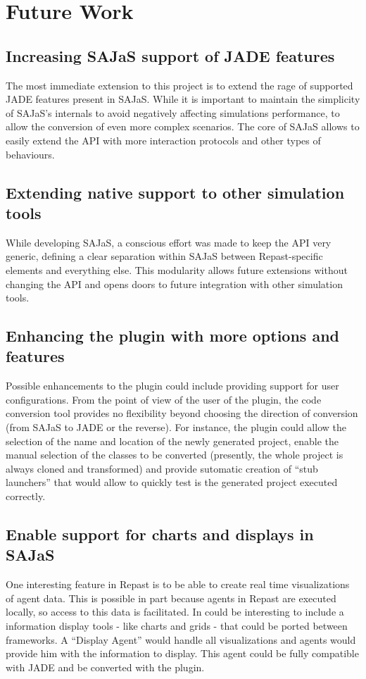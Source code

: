 \chapter{Future Work}
\label{chap:futurework}

\section{Increasing SAJaS support of JADE features}
The most immediate extension to this project is to extend the rage of supported JADE features present in SAJaS. While it is important to maintain the simplicity of SAJaS's internals to avoid negatively affecting simulations performance, to allow the conversion of even more complex scenarios. The core of SAJaS allows to easily extend the API with more interaction protocols and other types of behaviours.

\section{Extending native support to other simulation tools}
While developing SAJaS, a conscious effort was made to keep the API very generic, defining a clear separation within SAJaS between Repast-specific elements and everything else. This modularity allows future extensions without changing the API and opens doors to future integration with other simulation tools.

\section{Enhancing the plugin with more options and features}
Possible enhancements to the plugin could include providing support for user configurations. From the point of view of the user of the plugin, the code conversion tool provides no flexibility beyond choosing the direction of conversion (from SAJaS to JADE or the reverse). For instance, the plugin could allow the selection of the name and location of the newly generated project, enable the manual selection of the classes to be converted (presently, the whole project is always cloned and transformed) and provide sutomatic creation of ``stub launchers'' that would allow to quickly test is the generated project executed correctly.

\section{Enable support for charts and displays in SAJaS}
One interesting feature in Repast is to be able to create real time visualizations of agent data. This is possible in part because agents in Repast are executed locally, so access to this data is facilitated. In could be interesting to include a information display tools - like charts and grids - that could be ported between frameworks. A ``Display Agent'' would handle all visualizations and agents would provide him with the information to display. This agent could be fully compatible with JADE and be converted with the plugin.
